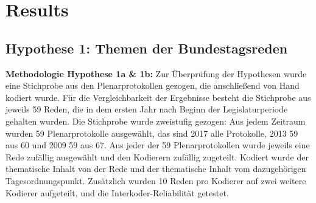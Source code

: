 \section{Results}


\subsection{Hypothese 1: Themen der Bundestagsreden}

{\bfseries Methodologie Hypothese 1a \& 1b:} Zur Überprüfung der Hypothesen wurde eine Stichprobe aus den Plenarprotokollen gezogen, die anschließend von Hand kodiert wurde. Für die Vergleichbarkeit der Ergebnisse besteht die Stichprobe aus jeweils 59 Reden, die in dem ersten Jahr nach Beginn der Legislaturperiode gehalten wurden. Die Stichprobe wurde zweistufig gezogen: Aus jedem Zeitraum wurden 59 Plenarprotokolle ausgewählt, das sind 2017 alle Protokolle, 2013 59 aus 60 und 2009 59 aus 67. Aus jeder der 59 Plenarprotokollen wurde jeweils eine Rede zufällig ausgewählt und den Kodierern zufällig zugeteilt. Kodiert wurde der thematische Inhalt von der Rede und der thematische Inhalt vom dazugehörigen Tagesordnungspunkt. Zusätzlich wurden 10 Reden pro Kodierer auf zwei weitere Kodierer aufgeteilt, und die Interkoder-Reliabilität getestet.\\

